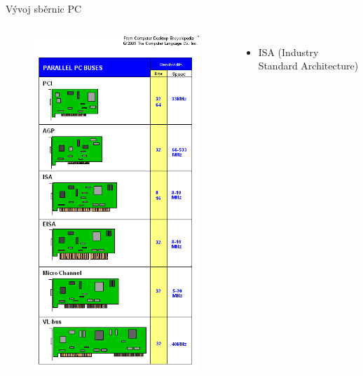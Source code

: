 \documentclass[aspectratio=43]{beamer}
\begin{document}
\begin{frame}{Vývoj sběrnic PC}
	
	\begin{columns}
        \begin{figure}[ht]
            \centering
            \includegraphics[width=0.85\linewidth]{extrahovane_obrazky/img_1_page6_0.png}
        \end{figure}
		\begin{itemize}
			\item ISA (Industry Standard Architecture)

\end{itemize}
\end{columns}
\end{frame}
\end{document}
